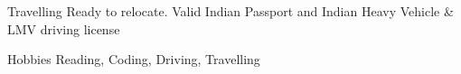 

\begin{cvskills}

  \cvskill
    {Travelling} %
    {Ready to relocate. Valid Indian Passport and Indian Heavy Vehicle \& LMV driving license} %

  \cvskill
    {Hobbies} %
    {Reading, Coding, Driving, Travelling} %

\end{cvskills}
